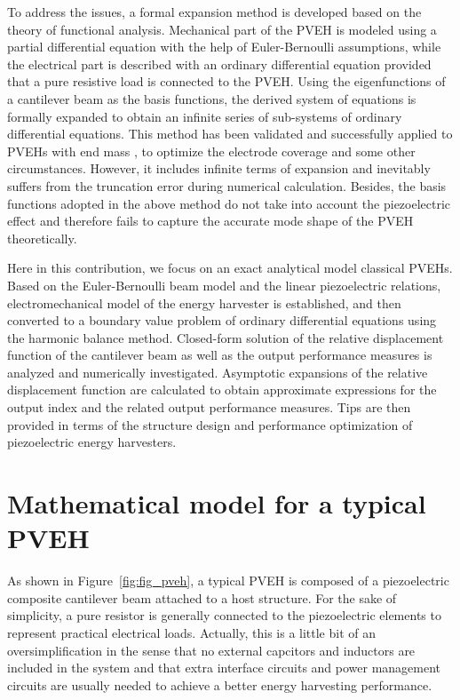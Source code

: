 \documentclass{article}
\begin{document}
To address the issues, a formal expansion method is developed based on the theory of functional analysis. \cite{kreyszig1978introductory} Mechanical part of the PVEH is modeled using a partial differential equation with the help of Euler-Bernoulli assumptions, while the electrical part is described with an ordinary differential equation provided that a pure resistive load is connected to the PVEH. \cite{erturk2008distributed} Using the eigenfunctions of a cantilever beam as the basis functions, the derived system of equations is formally expanded to obtain an infinite series of sub-systems of ordinary differential equations. This method has been validated and successfully applied to PVEHs with end mass \cite{erturk2009experimentally}, to optimize the electrode coverage \cite{erturk2009effect} and some other circumstances. However, it includes infinite terms of expansion and inevitably suffers from the truncation error during numerical calculation. Besides, the basis functions adopted in the above method do not take into account the piezoelectric effect and therefore fails to capture the accurate mode shape of the PVEH theoretically.

Here in this contribution, we focus on an exact analytical model classical PVEHs. Based on the Euler-Bernoulli beam model and the linear piezoelectric relations, electromechanical model of the energy harvester is established, and then converted to a boundary value problem of ordinary differential equations using the harmonic balance method. Closed-form solution of the relative displacement function of the cantilever beam as well as the output performance measures is analyzed and numerically investigated. Asymptotic expansions of the relative displacement function are calculated to obtain approximate expressions for the output index and the related output performance measures. Tips are then provided in terms of the structure design and performance optimization of piezoelectric energy harvesters. 


\section{Mathematical model for a typical PVEH}

As shown in Figure~\ref{fig:fig_pveh}, a typical PVEH is composed of a piezoelectric composite cantilever beam attached to a host structure. For the sake of simplicity, a pure resistor is generally connected to the piezoelectric elements to represent practical electrical loads. Actually, this is a little bit of an oversimplification in the sense that no external capcitors and inductors are included in the system and that extra interface circuits and power management circuits are usually needed to achieve a better energy harvesting performance. \cite{shu2006analysis,shu2007improved,qiu2009comparison} 
\end{document}
